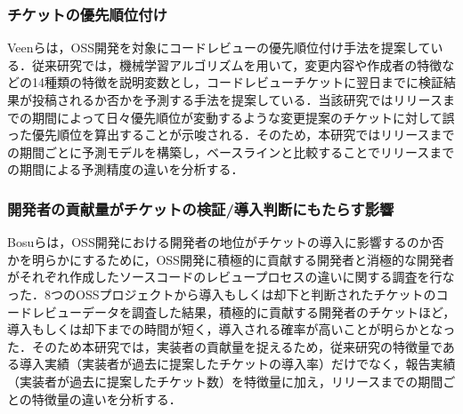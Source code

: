 \documentclass[T,J]{fose} %
\begin{document}
\subsubsection{チケットの優先順位付け}
Veen\cite{prioritizer}らは，OSS開発を対象にコードレビューの優先順位付け手法を提案している．従来研究では，機械学習アルゴリズムを用いて，変更内容や作成者の特徴などの14種類の特徴を説明変数とし，コードレビューチケットに翌日までに検証結果が投稿されるか否かを予測する手法を提案している．当該研究ではリリースまでの期間によって日々優先順位が変動するような変更提案のチケットに対して誤った優先順位を算出することが示唆される．そのため，本研究ではリリースまでの期間ごとに予測モデルを構築し，ベースラインと比較することでリリースまでの期間による予測精度の違いを分析する．



\subsubsection{開発者の貢献量がチケットの検証/導入判断にもたらす影響}
Bosu\cite{review1}らは，OSS開発における開発者の地位がチケットの導入に影響するのか否かを明らかにするために，OSS開発に積極的に貢献する開発者と消極的な開発者がそれぞれ作成したソースコードのレビュープロセスの違いに関する調査を行なった．8つのOSSプロジェクトから導入もしくは却下と判断されたチケットのコードレビューデータを調査した結果，積極的に貢献する開発者のチケットほど，導入もしくは却下までの時間が短く，導入される確率が高いことが明らかとなった．そのため本研究では，実装者の貢献量を捉えるため，従来研究\cite{prioritizer}の特徴量である導入実績（実装者が過去に提案したチケットの導入率）だけでなく，報告実績（実装者が過去に提案したチケット数）を特徴量に加え，リリースまでの期間ごとの特徴量の違いを分析する．
\end{document}
